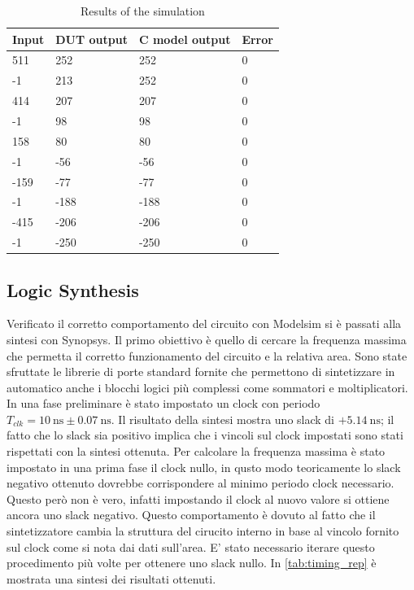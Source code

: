 \begin{table}[h]
\begin{center}
\begin{tabular}{|l|l|l|l|}
\hline
Input & DUT output & C model output & Error \\
\hline
511 & 252 & 252 & 0 \\
-1 & 213 & 252 & 0 \\
414 & 207 & 207 & 0 \\
-1 & 98 & 98 & 0 \\
158 & 80 & 80 & 0 \\
-1 & -56 & -56 & 0 \\
-159 & -77 & -77 & 0 \\
-1 & -188 & -188 & 0 \\
-415 & -206 & -206 & 0 \\
-1 & -250 & -250 & 0 \\
\hline
\end{tabular}
\end{center}
\caption{Results of the simulation}
\label{tab:tab_results}
\end{table}



\subsection{Logic Synthesis}
Verificato il corretto comportamento del circuito con Modelsim si è passati alla sintesi con Synopsys. Il primo obiettivo è quello di cercare la frequenza massima che permetta il corretto funzionamento del circuito e la relativa area. Sono state sfruttate le librerie di porte standard fornite che permettono di sintetizzare in automatico anche i blocchi logici più complessi come sommatori e moltiplicatori.
In una fase preliminare è stato impostato un clock con periodo $T_{clk} = \SI{10}{\nano\second} \pm \SI{0.07}{\nano\second}$. Il risultato della sintesi mostra uno slack di $+\SI{5.14}{\nano\second}$; il fatto che lo slack sia positivo implica che i vincoli sul clock impostati sono stati rispettati con la sintesi ottenuta.
Per calcolare la frequenza massima è stato impostato in una prima fase il clock nullo, in qusto modo teoricamente lo slack negativo ottenuto dovrebbe corrispondere al minimo periodo clock necessario. Questo però non è vero, infatti impostando il clock al nuovo valore si ottiene ancora uno slack negativo. Questo comportamento è dovuto al fatto che il sintetizzatore cambia la struttura del cirucito interno in base al vincolo fornito sul clock come si nota dai dati sull'area. E' stato necessario iterare questo procedimento più volte per ottenere uno slack nullo. In \autoref{tab:timing_rep} è mostrata una sintesi dei risultati ottenuti.

